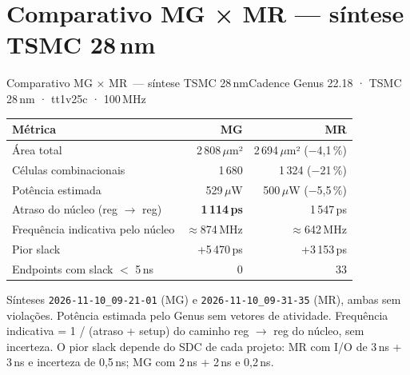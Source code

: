 \documentclass[aspectratio=169,10pt,t]{beamer}
\begin{document}
\section{Comparativo MG × MR — síntese TSMC 28\,nm}
\begin{frame}{Comparativo MG × MR~— síntese TSMC 28\,nm}{Cadence Genus 22.18 · TSMC 28\,nm · tt1v25c · 100\,MHz}
  \vspace{0.2cm}
  \begin{center}
      \footnotesize
      \begin{tabular}{@{}lrr@{}}
        \toprule
        Métrica & MG & MR \\
        \midrule
        Área total & 2\,808\,$\mu$m² & 2\,694\,$\mu$m² ($-$4,1\,\%) \\
        Células combinacionais & 1\,680 & 1\,324 ($-$21\,\%) \\
        Potência estimada & 529\,$\mu$W & 500\,$\mu$W ($-$5,5\,\%) \\
        Atraso do núcleo (reg $\rightarrow$ reg) & \textbf{1\,114\,ps} & 1\,547\,ps \\
        Frequência indicativa pelo núcleo & $\approx$874\,MHz & $\approx$642\,MHz \\
        Pior slack & +5\,470\,ps & +3\,153\,ps \\
        Endpoints com slack $<$ 5\,ns & 0 & 33 \\
        \bottomrule
      \end{tabular}
  \end{center}
  \vspace{0.2cm}
  {\tiny Sínteses \texttt{2026-11-10\_09-21-01} (MG) e \texttt{2026-11-10\_09-31-35} (MR), ambas sem violações.
  Potência estimada pelo Genus sem vetores de atividade. Frequência indicativa = 1 / (atraso + setup) do caminho reg $\rightarrow$ reg do núcleo, sem incerteza.
  O pior slack depende do SDC de cada projeto: MR com I/O de 3\,ns + 3\,ns e incerteza de 0,5\,ns; MG com 2\,ns + 2\,ns e 0,2\,ns.}
\end{frame}

\end{document}

